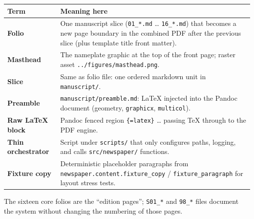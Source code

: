 \documentclass[
]{article}
\newcounter{none} %
\begin{document}
{\def\LTcaptype{none} %
\begin{longtable}[]{@{}
  >{\raggedright\arraybackslash}p{}
  >{\raggedright\arraybackslash}p{}@{}}
\toprule\noalign{}
\begin{minipage}[b]{\linewidth}\raggedright
Term
\end{minipage} & \begin{minipage}[b]{\linewidth}\raggedright
Meaning here
\end{minipage} \\
\midrule\noalign{}
\endhead
\bottomrule\noalign{}
\endlastfoot
\textbf{Folio} & One manuscript slice (\texttt{01\_*.md} \ldots{}
\texttt{16\_*.md}) that becomes a new page boundary in the combined PDF
after the previous slice (plus template title front matter). \\
\textbf{Masthead} & The nameplate graphic at the top of the front page;
raster asset \texttt{../figures/masthead.png}. \\
\textbf{Slice} & Same as folio file: one ordered markdown unit in
\texttt{manuscript/}. \\
\textbf{Preamble} & \texttt{manuscript/preamble.md}: LaTeX injected into
the Pandoc document (geometry, \texttt{graphicx}, \texttt{multicol}). \\
\textbf{Raw LaTeX block} & Pandoc fenced region
\texttt{\textasciigrave{}\textasciigrave{}\textasciigrave{}\{=latex\}}
\ldots{} \texttt{\textasciigrave{}\textasciigrave{}\textasciigrave{}}
passing TeX through to the PDF engine. \\
\textbf{Thin orchestrator} & Script under \texttt{scripts/} that only
configures paths, logging, and calls \texttt{src/newspaper/}
functions. \\
\textbf{Fixture copy} & Deterministic placeholder paragraphs from
\texttt{newspaper.content.fixture\_copy} / \texttt{fixture\_paragraph}
for layout stress tests. \\
\end{longtable}
}

The sixteen core folios are the ``edition pages''; \texttt{S01\_*} and
\texttt{98\_*} files document the system without changing the numbering
of those pages.




\end{document}
